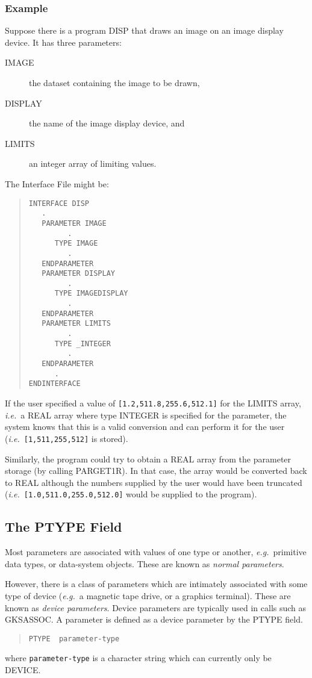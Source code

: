\documentclass[twoside,11pt]{article}
\newcommand{\xlabel}[1]{}
\renewcommand{\_}{\texttt{\symbol{95}}}
\begin{document}
\subsubsection*{Example}
Suppose there is a program DISP that draws an image on an
image display device. 
It has three parameters:
\begin{description}
\item[IMAGE] the dataset containing the image to be drawn, 
\item[DISPLAY] the name of the image display device, and
\item[LIMITS] an integer array of limiting values.
\end{description}
The Interface File might be:
\begin{quote} \begin{verbatim}
INTERFACE DISP
   .
   PARAMETER IMAGE
         .
      TYPE IMAGE
         .
   ENDPARAMETER
   PARAMETER DISPLAY
         .
      TYPE IMAGEDISPLAY
         .
   ENDPARAMETER
   PARAMETER LIMITS
         .
      TYPE _INTEGER
         .
   ENDPARAMETER
      .
ENDINTERFACE
\end{verbatim} \end{quote}
If the user specified a value of \texttt{[1.2,511.8,255.6,512.1]}
for the LIMITS array, {\em i.e.}\ a \_REAL array where type \_INTEGER is
specified for the parameter, the system knows that this is a valid 
conversion and can perform it for the user ({\em i.e.}\ \texttt{[1,511,255,512]} 
is stored).

Similarly, the program could try to obtain a \_REAL array from the
parameter storage (by calling PAR\_GET1R)\@. In that case, the array would be
converted back to \_REAL although the numbers supplied by the user would have
been truncated ({\em i.e.}\ \texttt{[1.0,511.0,255.0,512.0]} would be supplied 
to the program).

\subsection{The PTYPE Field\xlabel{the_ptype_field}}

Most parameters are associated with values of one type or another, {\em e.g.}\
primitive data types, or data-system objects. These are known as {\em normal
parameters}.

However, there is a class of parameters which are intimately associated with
some type of device ({\em e.g.}\ a magnetic tape drive, or a graphics terminal).
These are known as {\em device parameters}.
Device parameters are typically used in calls such as GKS\_ASSOC.
A parameter is defined as a device parameter by the PTYPE field.
\begin{quote} \begin{verbatim}
PTYPE  parameter-type
\end{verbatim} \end{quote}
where \texttt{parameter-type} is a character string which can currently only be
DEVICE.
\end{document}

